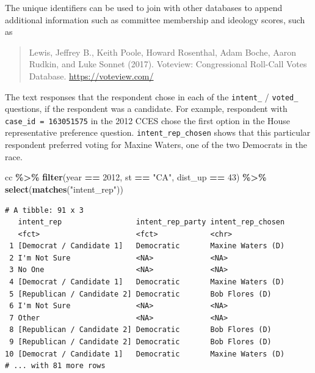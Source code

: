 \documentclass[10pt,article,oneside]{memoir}
\theoremstyle{definition}
\newenvironment{Shaded}{\begin{snugshade}}{\end{snugshade}}
\newcommand{\DecValTok}[1]{\textcolor[rgb]{0.00,0.00,0.81}{#1}}
\newcommand{\KeywordTok}[1]{\textcolor[rgb]{0.13,0.29,0.53}{\textbf{#1}}}
\newcommand{\NormalTok}[1]{#1}
\newcommand{\OperatorTok}[1]{\textcolor[rgb]{0.81,0.36,0.00}{\textbf{#1}}}
\newcommand{\StringTok}[1]{\textcolor[rgb]{0.31,0.60,0.02}{#1}}
\begin{document}
The unique identifiers can be used to join with other databases to
append additional information such as committee membership and ideology
scores, such as

\begin{quote}
Lewis, Jeffrey B., Keith Poole, Howard Rosenthal, Adam Boche, Aaron
Rudkin, and Luke Sonnet (2017). Voteview: Congressional Roll-Call Votes
Database. \url{https://voteview.com/}
\end{quote}

The text responses that the respondent chose in each of the
\texttt{intent\_} / \texttt{voted\_} questions, if the respondent was a
candidate. For example, respondent with \texttt{case\_id\ =\ 163051575}
in the 2012 CCES chose the first option in the House representative
preference question. \texttt{intent\_rep\_chosen} shows that this
particular respondent preferred voting for Maxine Waters, one of the two
Democrats in the race.

\begin{Shaded}
\begin{Highlighting}[]
\NormalTok{cc }\OperatorTok{\%>\%}\StringTok{ }
\StringTok{  }\KeywordTok{filter}\NormalTok{(year }\OperatorTok{==}\StringTok{ }\DecValTok{2012}\NormalTok{, st }\OperatorTok{==}\StringTok{ "CA"}\NormalTok{, dist\_up }\OperatorTok{==}\StringTok{ }\DecValTok{43}\NormalTok{) }\OperatorTok{\%>\%}\StringTok{ }
\StringTok{  }\KeywordTok{select}\NormalTok{(}\KeywordTok{matches}\NormalTok{(}\StringTok{"intent\_rep"}\NormalTok{)) }
\end{Highlighting}
\end{Shaded}

\begin{verbatim}
# A tibble: 91 x 3
   intent_rep                 intent_rep_party intent_rep_chosen
   <fct>                      <fct>            <chr>            
 1 [Democrat / Candidate 1]   Democratic       Maxine Waters (D)
 2 I'm Not Sure               <NA>             <NA>             
 3 No One                     <NA>             <NA>             
 4 [Democrat / Candidate 1]   Democratic       Maxine Waters (D)
 5 [Republican / Candidate 2] Democratic       Bob Flores (D)   
 6 I'm Not Sure               <NA>             <NA>             
 7 Other                      <NA>             <NA>             
 8 [Republican / Candidate 2] Democratic       Bob Flores (D)   
 9 [Republican / Candidate 2] Democratic       Bob Flores (D)   
10 [Democrat / Candidate 1]   Democratic       Maxine Waters (D)
# ... with 81 more rows
\end{verbatim}
\end{document}
